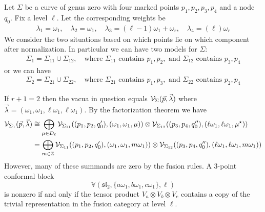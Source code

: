 \documentclass[12pt]{article}
\begin{document}
\begin{example}
    Let $\Sigma$ be a curve of genus zero with four marked points $p_1,p_2,p_3,p_4$ and a node $q_0$. Fix a level $\ell$. Let the corresponding weights be \begin{align*}
        \lambda_1 = \omega_1 , \quad \lambda_2 = \omega_1 , \quad \lambda_3 = (\ell - 1)\omega_1 + \omega_r , \quad \lambda_4 = (\ell)\omega_r
    \end{align*}
    We consider the two situations based on which points lie on which component after normalization. In particular we can have two models for $\Sigma$: \begin{align*}
        \Sigma_1 = \Sigma_{11} \cup \Sigma_{12}, \quad \text{where } \Sigma_{11} \text{ contains } p_1,p_2, \text{ and } \Sigma_{12} \text{ contains } p_3,p_4
    \end{align*}
    or we can have \begin{align*}
        \Sigma_2 = \Sigma_{21} \cup \Sigma_{22}, \quad \text{where } \Sigma_{21} \text{ contains } p_1,p_3, \text{ and } \Sigma_{22} \text{ contains } p_2,p_4
    \end{align*}

    If $r+1 = 2$ then the vacua in question equals ${\mathcal{V}}_{\Sigma}(\vec p, \vec \lambda)$ where $\vec \lambda = (\omega_1, \omega_1, \ell \omega_1, \ell \omega_1)$. By the factorization theorem we have \begin{align*}
        {\mathcal{V}}_{\Sigma_1}(\vec p, \vec \lambda) &\cong \bigoplus_{\mu \in D_\ell} {\mathcal{V}}_{\Sigma_{11}}((p_1,p_2,q'_0), (\omega_1, \omega_1, \mu)) \otimes {\mathcal{V}}_{\Sigma_{12}}((p_3,p_4,q''_0), (\ell \omega_1, \ell \omega_1, \mu^\star)) \\
        &= \bigoplus_{m\in \mathbb{Z}} {\mathcal{V}}_{\Sigma_{11}}((p_1,p_2,q'_0), (\omega_1, \omega_1, m \omega_1)) \otimes {\mathcal{V}}_{\Sigma_{12}}((p_3,p_4,q''_0), (\ell \omega_1, \ell \omega_1, m \omega_1))
    \end{align*}
However, many of these summands are zero by the fusion rules. A 3-point conformal block
\[\mathbb V(\mathfrak{sl}_2,\{a\omega_1,b\omega_1,c\omega_1\},\ell)\]
is nonzero if and only if the tensor product $V_a\otimes V_b\otimes V_c$ contains a copy of the trivial representation in the fusion category at level $\ell$.


\end{example}
\end{document}
